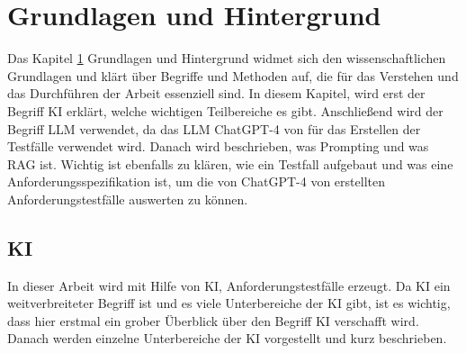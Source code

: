 \documentclass[12pt,toc=bib,toc=listof]{scrreprt}
\begin{document}
\chapter{Grundlagen und Hintergrund} %
\label{sec:grundlagenUndHintergrund}
Das Kapitel \ref{sec:grundlagenUndHintergrund} Grundlagen und Hintergrund widmet sich den wissenschaftlichen Grundlagen und klärt über Begriffe und Methoden auf, die für das Verstehen und das Durchführen der Arbeit essenziell sind. In diesem Kapitel, wird erst der Begriff KI erklärt, welche wichtigen Teilbereiche es gibt. Anschließend wird der Begriff LLM verwendet, da das LLM ChatGPT-4 von \textcite{OpenAI2025} für das Erstellen der Testfälle verwendet wird. Danach wird beschrieben, was Prompting und was RAG ist. Wichtig ist ebenfalls zu klären, wie ein Testfall aufgebaut und was eine Anforderungsspezifikation ist, um die von ChatGPT-4 von \textcite{OpenAI2025} erstellten Anforderungstestfälle auswerten zu können.

\section{KI} %
\label{sec:KI}
In dieser Arbeit wird mit Hilfe von KI, Anforderungstestfälle erzeugt. Da KI ein weitverbreiteter Begriff ist und es viele Unterbereiche der KI gibt, ist es wichtig, dass hier erstmal ein grober Überblick über den Begriff KI verschafft wird. Danach werden einzelne Unterbereiche der KI vorgestellt und kurz beschrieben.
\end{document}
